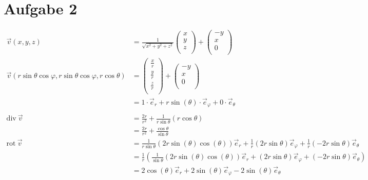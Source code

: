 \documentclass[10pt,a4paper,parskip=half]{scrartcl}
\newcommand{\vecthree}[3]{\begin{pmatrix}#1\\#2\\#3\\\end {pmatrix}}
\begin{document}
\section*{Aufgabe 2}
\begin{align*}
\vec v(x,y,z) &= \frac{1}{\sqrt{x^2 + y^2 + z^2}}\vecthree{x}{y}{z} + \vecthree{-y}{x}{0}\\
\vec v(r \sin \theta \cos \varphi, r \sin \theta \cos \varphi, r \cos \theta )&= \vecthree{\frac{x}{r}}{\frac{y}{r}}{\frac{z}{r}} + \vecthree{-y}{x}{0} \\
&= 1\cdot \vec e_r + r \sin(\theta) \cdot \vec e_\varphi + 0 \cdot \vec e_\theta \\
\\
\text{div}\ \vec v &= \frac{2r}{r^2} + \frac{1}{r \sin \theta}(r\cos \theta)\\
&= \frac{2r}{r^2} + \frac{\cos \theta}{\sin \theta}\\
\text{rot}\ \vec v &= \frac{1}{r\sin \theta}\left( 2r\sin(\theta)\cos(\theta) \right)\vec e_r + \frac{1}{r}(2r\sin \theta)\vec e_\varphi + \frac{1}{r}\left(-2r\sin \theta \right) \vec e_\theta \\
&= \frac{1}{r} \left(\frac{1}{\sin \theta}\left( 2r\sin(\theta)\cos(\theta) \right)\vec e_r + (2r\sin \theta)\vec e_\varphi + \left(-2r\sin \theta \right) \vec e_\theta\right) \\
&= 2\cos(\theta) \vec e_r + 2\sin (\theta)\vec e_\varphi - 2\sin (\theta) \vec e_\theta\\
\end{align*}
\end{document}
